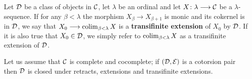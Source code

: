 \begin{definition}
	Let $\mathcal{D}$ be a class of objects in $\mathcal{C}$, let $\lambda$ be an ordinal and let $X\colon \lambda \longrightarrow \mathcal{C}$ be a $\lambda$-sequence. If for any $\beta < \lambda$ the morphism $X_\beta \longrightarrow X_{\beta +1}$ is monic and its cokernel is in $\mathcal{D}$, we say that $X_0\longrightarrow \colim_{\beta < \lambda} X$ is a \textbf{transifinite extension} of $X_0$ by $\mathcal{D}$. If it is also true that $X_0 \in \mathcal{D}$, we simply refer to $\colim_{\beta < \lambda} X$ as a transifinite extension of $\mathcal{D}$.
\end{definition}

\begin{lemma}
	\label{lem:cotorsion-trans}
	Let us assume that $\mathcal{C}$ is complete and cocomplete; if $(\mathcal{D}, \mathcal{E})$ is a cotorsion pair then $\mathcal{D}$ is closed under retracts, extensions and transifinite extensions.
\end{lemma}
